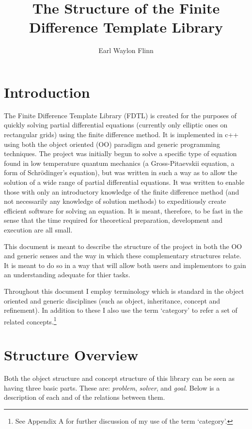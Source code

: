 \documentclass{article}
\title{The Structure of the Finite Difference Template Library}
\author{Earl Waylon Flinn}
\begin{document}
\maketitle
\section{Introduction}


The Finite Difference Template Library (FDTL) is created for the purposes of quickly solving
partial differential equations (currently
only elliptic ones on rectangular grids) using the finite difference method. It is implemented in c++ using both the object
oriented (OO) paradigm and generic programming techniques. The project was initially begun to solve a specific
type of equation found in low temperature quantum mechanics (a Gross-Pitaevskii equation, a form of
Schr\"odinger's equation), but was written
in such a way as to allow the solution of a wide range of partial differential equations. It was written
to enable those with only an introductory knowledge of the finite difference method
(and not necessarily any knowledge of solution methods) to  expeditiously create efficient software
for solving an equation. It is meant, therefore, to be fast in the sense that the time required for
theoretical preparation, development and execution are all small.


This document is meant to describe the structure of the project in both the OO and generic senses and the
way in which these complementary structures relate. It is meant to do so in a way that will allow both users
and implementors to gain an understanding adequate for thier tasks.


Throughout this document I employ terminology which is standard in the object oriented and generic disciplines (such as object, inheritance,
concept and refinement). In addition to these I also use the term `category' to refer a set of related
concepts.\footnote{ See Appendix A for further discussion of my use of the term `category'.}

\section{Structure Overview}

Both the object structure and concept structure of this library can be seen as having
three basic parts. These are: \emph{problem},
\emph{solver}, and \emph{goal}. Below is a description of each and of the relations between them.
\end{document}
